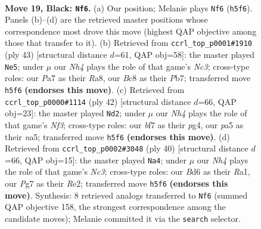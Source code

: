 \documentclass[11pt]{article}
\begin{document}
\clearpage

\begin{figure}[p]\centering
\begin{subfigure}{0.46\textwidth}\centering
\resizebox{\linewidth}{!}{%
\newchessgame
\chessboard[
  setfen={r1b4k/pp3Bpp/n2b4/P4p1n/8/1P2P1P1/5P2/RNB2RK1 b - - 0 19},
  showmover=false,
  pgfstyle=straightmove, color=movearrow, markmove={h5-f6}
]}
\caption{}
\end{subfigure}\hfill
\begin{subfigure}{0.46\textwidth}\centering
\resizebox{\linewidth}{!}{%
\newchessgame
\chessboard[
  setfen={r7/pp3pkp/1bn5/8/bP2B3/P3P3/5PPP/R1R3K1 b - - 0 22},
  showmover=false,
  pgfstyle=straightmove, color=movearrow, markmove={c6-e5}
]}
\caption{}
\end{subfigure}
\\[4pt]
\begin{subfigure}{0.46\textwidth}\centering
\resizebox{\linewidth}{!}{%
\newchessgame
\chessboard[
  setfen={r2r4/pp1b2k1/5p2/n2Pp3/4P1p1/2KB1N2/P4PPR/R7 w - - 0 22},
  showmover=false,
  pgfstyle=straightmove, color=movearrow, markmove={f3-d2}
]}
\caption{}
\end{subfigure}\hfill
\begin{subfigure}{0.46\textwidth}\centering
\resizebox{\linewidth}{!}{%
\newchessgame
\chessboard[
  setfen={r5k1/1pp2r1p/p1p3p1/P4b2/1b1B4/2N5/1PP1RPPP/R5K1 w - - 0 21},
  showmover=false,
  pgfstyle=straightmove, color=movearrow, markmove={c3-a4}
]}
\caption{}
\end{subfigure}
\caption{\textbf{Move 19, Black: \texttt{Nf6}.} (a) Our position; Melanie plays \texttt{Nf6} (\texttt{h5f6}). Panels (b)--(d) are the retrieved master positions whose correspondence most drove this move (highest QAP objective among those that transfer to it). (b) Retrieved from \texttt{ccrl\_top\_p0001\#1910} (ply 43) [structural distance $d$=61, QAP obj=58]: the master played \texttt{Ne5}; under $\mu$ our \emph{Nh4} plays the role of that game's \emph{Nc3}; cross-type roles: our \emph{P}a7 as their \emph{R}a8, our \emph{B}c8 as their \emph{P}b7; transferred move \texttt{h5f6} \textbf{(endorses this move)}. (c) Retrieved from \texttt{ccrl\_top\_p0000\#1114} (ply 42) [structural distance $d$=66, QAP obj=23]: the master played \texttt{Nd2}; under $\mu$ our \emph{Nh4} plays the role of that game's \emph{Nf3}; cross-type roles: our \emph{b}f7 as their \emph{p}g4, our \emph{p}a5 as their \emph{n}a5; transferred move \texttt{h5f6} \textbf{(endorses this move)}. (d) Retrieved from \texttt{ccrl\_top\_p0002\#3048} (ply 40) [structural distance $d$=66, QAP obj=15]: the master played \texttt{Na4}; under $\mu$ our \emph{Nh4} plays the role of that game's \emph{Nc3}; cross-type roles: our \emph{B}d6 as their \emph{R}a1, our \emph{P}g7 as their \emph{R}e2; transferred move \texttt{h5f6} \textbf{(endorses this move)}. Synthesis: 8 retrieved analogs transferred to \texttt{Nf6} (summed QAP objective 158, the strongest correspondence among the candidate moves); Melanie committed it via the \texttt{search} selector.}
\label{fig:thought-m37}
\end{figure}
\end{document}
